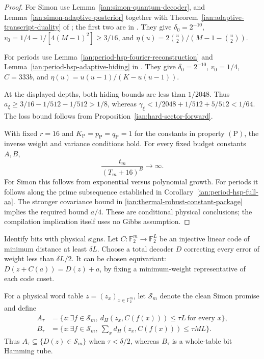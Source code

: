 \begin{proof}
For Simon use
Lemma~\ref{ian:simon-quantum-decoder}, and
Lemma~\ref{ian:simon-adaptive-posterior} together with
Theorem~\ref{ian:adaptive-transcript-duality} of
; the first two are in
. They give
\(\delta_0=2^{-10}\),
\(v_0=1/4-1/[4(M-1)^2]\ge3/16\), and
\(\eta(u)=2\binom u2/(M-1-\binom u2)\).

For periods use
Lemma~\ref{ian:period-hsp-fourier-reconstruction} and
Lemma~\ref{ian:period-hsp-adaptive-hiding} in
. They give
\(\delta_0=2^{-10}\), \(v_0=1/4\),
\(C=333b\), and
\(\eta(u)=u(u-1)/(K-u(u-1))\).

At the displayed depths, both hiding bounds are less than
\(1/2048\). Thus
\(a_\xi\ge3/16-1/512-1/512>1/8\), whereas
\(\gamma_\xi<
1/2048+1/512+5/512<1/64\).
The loss bound follows from
Proposition~\ref{ian:hard-sector-forward}.

With fixed \(r=16\) and \(K_{\mathrm P}=p_{\mathrm P}=q_{\mathrm P}=1\)
for the constants in property \(\mathrm{(P)}\), the inverse weight and
variance conditions hold. For every fixed budget constants \(A,B\),
\[
 \frac{t_m}{(T_m+16)^B}\longrightarrow\infty .
 \tag{38.8}
\]
For Simon this follows from exponential versus polynomial growth.
For periods it follows along the prime subsequence established in
Corollary~\ref{ian:period-hsp-full-aa}.
The stronger covariance bound in
\eqref{ian:thermal-robust-constant-package} implies the required
bound \(a/4\). These are conditional physical conclusions; the
compilation implication itself uses no Gibbs assumption.
\end{proof}

\begin{definition}
\label{ian:thermal-bit-neighborhoods}
Identify bits with physical signs. Let
\(C:\mathbb F_2^m\to\mathbb F_2^L\) be an injective linear code of
minimum distance at least \(\delta L\).
Choose a total decoder \(D\) correcting every error of weight
less than \(\delta L/2\).
It can be chosen equivariant:
\(D(z+C(a))=D(z)+a\), by fixing a minimum-weight representative
of each code coset.

For a physical word table \(z=(z_x)_{x\in\mathbb F_2^m}\), let
\(\mathcal S_m\) denote the clean Simon promise and define
\[
 \begin{aligned}
 A_\tau
   &=\{z:\exists f\in\mathcal S_m,\
       d_H(z_x,C(f(x)))\le\tau L\ \text{for every }x\},\\
 B_\tau
   &=\{z:\exists f\in\mathcal S_m,\
       \sum_xd_H(z_x,C(f(x)))\le\tau ML\}.
 \end{aligned}
 \tag{38.9}
\]
Thus \(A_\tau\subseteq\{D(z)\in\mathcal S_m\}\) when
\(\tau<\delta/2\), whereas \(B_\tau\) is a whole-table bit
Hamming tube.
\end{definition}

